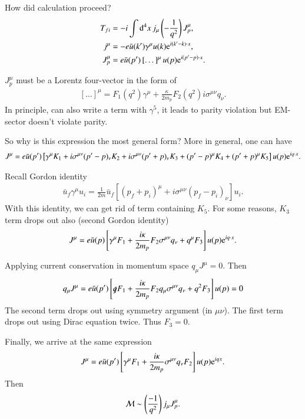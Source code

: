 How did calculation proceed?
\begin{align*}
   T_{fi} &= -i \int \dd[4]{x} j_\mu \left( - \frac{1}{q^2} \right) J_p^\mu, \\
   j^\mu &= -e \bar{u}(k') \gamma^\mu u(k) \mathrm{e}^{i(k'-k)\cdot x}, \\
   J_p^\mu &= e \bar{u}(p')  \left[ \dots  \right]^\mu u(p) \mathrm{e}^{i (p'-p)\cdot x}.
\end{align*}

$J_p^\mu$ must be a Lorentz four-vector in the form of
\begin{align*}
   \left[ \dots \right]^\mu = F_1(q^2) \gamma^\mu + \frac{\kappa}{2 m_p} F_2 (q^2) i \sigma^{\mu\nu} q_\nu.
\end{align*}
In principle, can also write a term with $\gamma^5$, it leads to parity violation but EM-sector doesn't violate parity. 

So why is this expression the most general form? More in general, one can have
\begin{align*}
   J^\mu = e \bar{u}(p') \left[ \gamma^\mu K_1 + i \sigma^{\mu\nu} (p'-p)_\nu K_2 + i\sigma^{\mu\nu} (p' + p)_\nu K_3 + (p'-p)^\mu K_4 + (p'+p)^\mu K_5 \right] u(p) \mathrm{e}^{i q \cdot x}.
\end{align*}

Recall Gordon identity
\begin{align}
   \bar{u}_f \gamma^\mu u_i = \frac{1}{2m} \bar{u}_f \left[ (p_f + p_i)^\mu + i \sigma^{\mu\nu} (p_f - p_i)_\nu \right] u_i.
\end{align}
With this identity, we can get rid of term containing $K_5$. For some reasons, $K_3$ term drops out also (second Gordon identity)
\begin{align*}
   J^\mu = e \bar{u}(p) \left[ \gamma^\mu F_1 + \frac{i \kappa}{2 m_p} F_2 \sigma^{\mu\nu} q_\nu + q^\mu F_3 \right] u(p) \mathrm{e}^{iq\cdot x}.
\end{align*}

Applying current conservation in momentum space $q_\mu J^\mu = 0$. Then
\begin{align*}
   q_\mu J^\mu = e \bar{u}(p') \left[ \slashed{q} F_1 + \frac{i\kappa}{2m_p} F_2 q_\mu \sigma^{\mu\nu} q_\nu + q^2 F_3  \right] u(p) = 0
\end{align*}
The second term drops out using symmetry argument (in $\mu\nu$). The first term drops out using Dirac equation twice. Thus $F_3 = 0$.

Finally, we arrive at the same expression
\begin{align*}
   J^\mu = e \bar{u}(p') \left[ \gamma^\mu F_1 + \frac{i\kappa}{2 m_p} \sigma^{\mu\nu} q_\nu F_2 \right]u(p) \mathrm{e}^{iqx}.
\end{align*}
Then
\begin{align*}
   \mathcal{M} \sim \left( \frac{-1}{q^2} \right) j_\mu J_p^\mu.
\end{align*}

